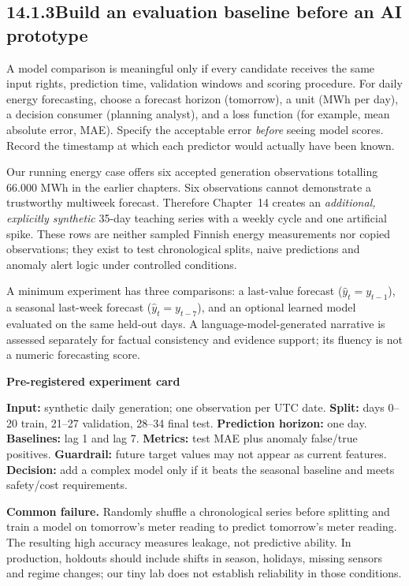 \documentclass[11pt,twoside]{article}
\newcommand{\topic}[2]{\subsection*{#1\quad #2}}
\begin{document}
\topic{14.1.3}{Build an evaluation baseline before an AI prototype}
A model comparison is meaningful only if every candidate receives the same input rights, prediction time, validation windows and scoring procedure. For daily energy forecasting, choose a forecast horizon (tomorrow), a unit (MWh per day), a decision consumer (planning analyst), and a loss function (for example, mean absolute error, MAE). Specify the acceptable error\emph{ before} seeing model scores. Record the timestamp at which each predictor would actually have been known.

Our running energy case offers six accepted generation observations totalling 66.000 MWh in the earlier chapters. Six observations cannot demonstrate a trustworthy multiweek forecast. Therefore Chapter~14 creates an \emph{additional, explicitly synthetic} 35-day teaching series with a weekly cycle and one artificial spike. These rows are neither sampled Finnish energy measurements nor copied observations; they exist to test chronological splits, naive predictions and anomaly alert logic under controlled conditions.

A minimum experiment has three comparisons: a last-value forecast ($\hat y_t=y_{t-1}$), a seasonal last-week forecast ($\hat y_t=y_{t-7}$), and an optional learned model evaluated on the same held-out days. A language-model-generated narrative is assessed separately for factual consistency and evidence support; its fluency is not a numeric forecasting score.
\begin{whitebox}\textbf{Pre-registered experiment card}\par
\textbf{Input:} synthetic daily generation; one observation per UTC date. \textbf{Split:} days 0--20 train, 21--27 validation, 28--34 final test. \textbf{Prediction horizon:} one day. \textbf{Baselines:} lag 1 and lag 7. \textbf{Metrics:} test MAE plus anomaly false/true positives. \textbf{Guardrail:} future target values may not appear as current features. \textbf{Decision:} add a complex model only if it beats the seasonal baseline and meets safety/cost requirements.
\end{whitebox}
\textbf{Common failure.} Randomly shuffle a chronological series before splitting and train a model on tomorrow's meter reading to predict tomorrow's meter reading. The resulting high accuracy measures leakage, not predictive ability. In production, holdouts should include shifts in season, holidays, missing sensors and regime changes; our tiny lab does not establish reliability in those conditions.
\end{document}
